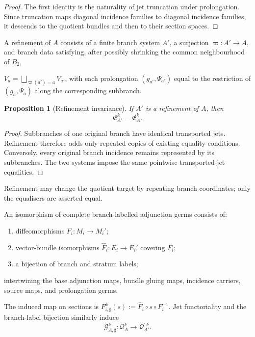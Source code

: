 \documentclass[11pt]{article}
\theoremstyle{plain}
\newtheorem{proposition}[theorem]{Proposition}
\theoremstyle{definition}
\begin{document}
\begin{proof}
The first identity is the naturality of jet truncation under
prolongation. Since truncation maps diagonal incidence families to
diagonal incidence families, it descends to the quotient bundles and
then to their section spaces.
\end{proof}

A refinement of \(A\) consists of a finite branch system \(A'\), a
surjection
\(\varpi:A'\longrightarrow A\),
and branch data satisfying, after possibly shrinking the common
neighbourhood of \(B_2\),

\(V_a = \bigsqcup_{\varpi(a')=a}V_{a'}\),
with each prolongation \((g_{a'},\Psi_{a'})\) equal to the restriction
of \((g_a,\Psi_a)\) along the corresponding subbranch.

\begin{proposition}[Refinement invariance]
\label{prop:branch-refinement}
If \(A'\) is a refinement of \(A\), then
\[
  \mathfrak E_{A'}^k
  =
  \mathfrak E_A^k.
\]
\end{proposition}

\begin{proof}
Subbranches of one original branch have identical transported jets.
Refinement therefore adds only repeated copies of existing equality
conditions. Conversely, every original branch incidence remains
represented by its subbranches. The two systems impose the same
pointwise transported-jet equalities.
\end{proof}

Refinement may change the quotient target by repeating branch coordinates; only the equalisers are asserted equal.

An isomorphism of complete branch-labelled adjunction germs consists of:

\begin{enumerate}[label=\textup{(\roman*)}]
  \item diffeomorphisms
        \(F_i:M_i\longrightarrow M_i'\);

  \item vector-bundle isomorphisms \(\widehat F_i:E_i\longrightarrow E_i'\)         covering \(F_i\);

  \item a bijection of branch and stratum labels;
\end{enumerate}
intertwining the base adjunction maps, bundle gluing maps, incidence
carriers, source maps, and prolongation germs.

The induced map on sections is
\(F_{i,\sharp}^k(s) := \widehat F_i \circ s\circ F_i^{-1}\).
Jet functoriality and the branch-label bijection similarly induce
\[
  \mathcal G_{A,\sharp}^k:
  \mathcal Q_A^k
  \longrightarrow
  \mathcal Q_{A'}^{\prime\,k}.
\]
\end{document}
